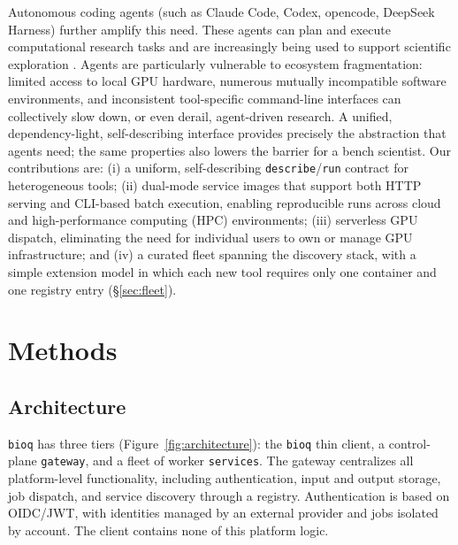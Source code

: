 \documentclass[webpdf,contemporary,large,namedate]{oup-authoring-template}%
\begin{document}
Autonomous coding agents (such as Claude Code, Codex, opencode,
DeepSeek Harness) further amplify this need. These agents can plan and
execute computational research tasks and are increasingly being used
to support scientific exploration
\citep{gottweis_accelerating_2026,ghareeb_multi-agent_2026,huang_autonomous_2026}.
Agents are particularly vulnerable to ecosystem fragmentation: limited
access to local GPU hardware, numerous mutually incompatible software
environments, and inconsistent tool-specific command-line interfaces
can collectively slow down, or even derail, agent-driven research. A
unified, dependency-light, self-describing interface provides
precisely the abstraction that agents need; the same properties also
lowers the barrier for a bench scientist. Our contributions are: (i) a
uniform, self-describing \texttt{describe}/\texttt{run} contract for
heterogeneous tools; (ii) dual-mode service images that support both
HTTP serving and CLI-based batch execution, enabling reproducible runs
across cloud and high-performance computing (HPC) environments; (iii)
serverless GPU dispatch, eliminating the need for individual users to
own or manage GPU infrastructure; and (iv) a curated fleet spanning
the discovery stack, with a simple extension model in which each new
tool requires only one container and one registry entry
(\S\ref{sec:fleet}).

\section{Methods}\label{sec:methods}

\subsection{Architecture}\label{sec:architecture}

\texttt{bioq} has three tiers (Figure~\ref{fig:architecture}): the
\texttt{bioq} thin client, a control-plane \texttt{gateway}, and a
fleet of worker \texttt{services}. The gateway centralizes all
platform-level functionality, including authentication, input and
output storage, job dispatch, and service discovery through a
registry. Authentication is based on OIDC/JWT, with identities managed
by an external provider and jobs isolated by account. The client
contains none of this platform logic.
\end{document}
